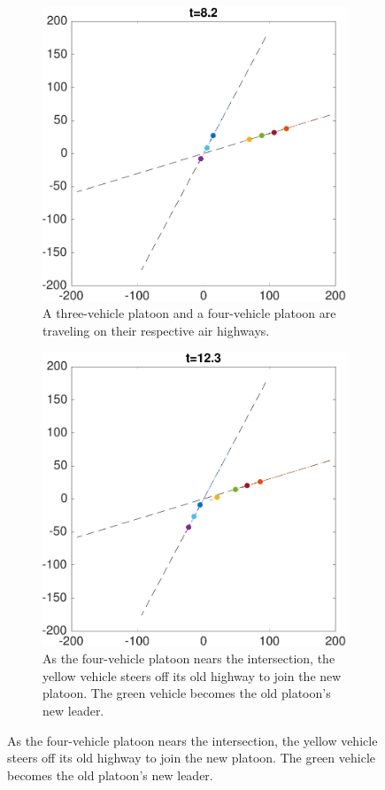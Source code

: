 \begin{figure}
    \centering
    \begin{subfigure}[t]{0.45\textwidth} \label{subfig:ch_83}
        \includegraphics[width=\textwidth]{fig/ch_83}
        \caption{A three-vehicle platoon and a four-vehicle platoon are traveling on their respective air highways.}
    \end{subfigure}
    \begin{subfigure}[t]{0.45\textwidth} \label{subfig:ch_124}
        \includegraphics[width=\textwidth]{fig/ch_124}
        \caption{As the four-vehicle platoon nears the intersection, the yellow vehicle steers off its old highway to join the new platoon. The green vehicle becomes the old platoon's new leader.}
    \end{subfigure}


\end{figure}
